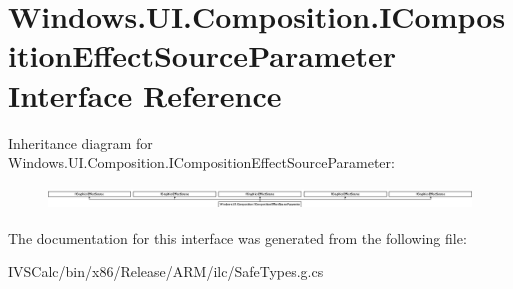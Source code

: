 \hypertarget{interface_windows_1_1_u_i_1_1_composition_1_1_i_composition_effect_source_parameter}{}\section{Windows.\+U\+I.\+Composition.\+I\+Composition\+Effect\+Source\+Parameter Interface Reference}
\label{interface_windows_1_1_u_i_1_1_composition_1_1_i_composition_effect_source_parameter}
Inheritance diagram for Windows.\+U\+I.\+Composition.\+I\+Composition\+Effect\+Source\+Parameter\+:\begin{figure}[H]
\begin{center}
\leavevmode
\includegraphics[height=0.615385cm]{interface_windows_1_1_u_i_1_1_composition_1_1_i_composition_effect_source_parameter}
\end{center}
\end{figure}


The documentation for this interface was generated from the following file\+:\begin{DoxyCompactItemize}
\item 
I\+V\+S\+Calc/bin/x86/\+Release/\+A\+R\+M/ilc/Safe\+Types.\+g.\+cs\end{DoxyCompactItemize}
